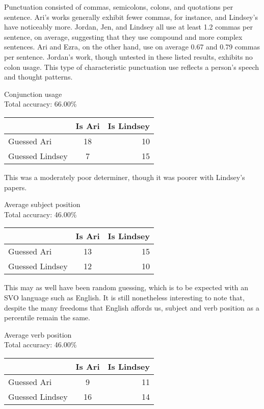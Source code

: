 \documentclass[twocolumn]{article}
\begin{document}
  Punctuation consisted of commas, semicolons, colons, and quotations per sentence. Ari's works generally exhibit fewer commas, for instance, and Lindsey's have noticeably more. Jordan, Jen, and Lindsey all use at least 1.2 commas per sentence, on average, suggesting that they use compound and more complex sentences. Ari and Ezra, on the other hand, use on average 0.67 and 0.79 commas per sentence. Jordan's work, though untested in these listed results, exhibits no colon usage. This type of characteristic punctuation use reflects a person's speech and thought patterns.
  
  \begin{center}
    Conjunction usage \\
    Total accuracy: 66.00\%
    \begin{tabular}{ l || c | r }
      \hline
      & Is Ari & Is Lindsey \\ \hline
      Guessed Ari & 18 & 10 \\ \hline
      Guessed Lindsey & 7 & 15 \\
      \hline
    \end{tabular}
  \end{center}
  
  This was a moderately poor determiner, though it was poorer with Lindsey's papers.

  \begin{center}
    Average subject position \\
    Total accuracy: 46.00\%
    \begin{tabular}{ l || c | r }
      \hline
      & Is Ari & Is Lindsey \\ \hline
      Guessed Ari & 13 & 15 \\ \hline
      Guessed Lindsey & 12 & 10 \\
      \hline
    \end{tabular}
  \end{center}
  
  This may as well have been random guessing, which is to be expected with an SVO language such as English. It is still nonetheless interesting to note that, despite the many freedoms that English affords us, subject and verb position as a percentile remain the same.
  
  \begin{center}
    Average verb position \\
    Total accuracy: 46.00\%
    \begin{tabular}{ l || c | r }
      \hline
      & Is Ari & Is Lindsey \\ \hline
      Guessed Ari & 9 & 11 \\ \hline
      Guessed Lindsey & 16 & 14 \\
      \hline
    \end{tabular}
  \end{center}
  
\end{document}
